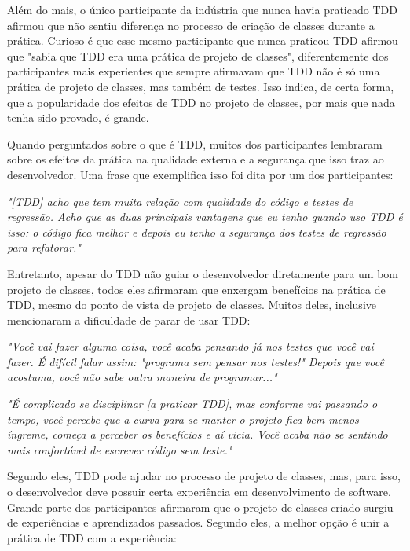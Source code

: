 Além do mais, o único participante da indústria que nunca havia
praticado TDD afirmou que não sentiu diferença no processo de criação de classes durante
a prática.
Curioso é que esse mesmo participante que nunca praticou TDD afirmou que "sabia que TDD era uma prática de projeto de classes",
diferentemente dos participantes mais experientes que sempre afirmavam que TDD não é só uma prática de projeto de classes,
mas também de testes. Isso indica, de certa forma, que a popularidade dos efeitos de TDD no projeto de classes, por mais
que nada tenha sido provado, é grande.

Quando perguntados sobre o que é TDD, muitos dos participantes lembraram sobre
os efeitos da prática na qualidade externa e a segurança que isso traz
ao desenvolvedor.
Uma frase que exemplifica isso foi dita por um dos participantes:

\begin{framed}
\textit{"[TDD] acho que tem muita relação com qualidade do código e testes 
de regressão. Acho que as duas principais vantagens que eu tenho quando uso TDD é isso: o código
fica melhor e depois eu tenho a segurança dos testes de regressão para refatorar."}
\end{framed}

Entretanto, apesar do TDD não guiar o desenvolvedor diretamente para um bom projeto de classes,
todos eles afirmaram que enxergam benefícios na prática de TDD, mesmo do
ponto de vista de projeto de classes. Muitos deles, inclusive mencionaram a dificuldade
de parar de usar TDD:

\begin{framed}
\textit{"Você vai fazer alguma coisa, você acaba pensando já nos testes que você vai fazer. É difícil 
falar assim: "programa sem pensar nos testes!" Depois que você acostuma, você não sabe outra
maneira de programar..."}
\end{framed}

\begin{framed}
\textit{"É complicado se disciplinar [a praticar TDD], mas conforme vai passando o tempo, 
você percebe que a curva para se manter o projeto fica bem menos íngreme, 
começa a perceber os benefícios e aí vicia. Você acaba não se sentindo
mais confortável de escrever código sem teste."}
\end{framed}

Segundo eles, TDD pode ajudar no processo de projeto de classes, mas, para isso,
o desenvolvedor deve possuir certa experiência em desenvolvimento de software. 
Grande parte dos participantes afirmaram que o 
projeto de classes criado surgiu de experiências e aprendizados passados.
Segundo eles, a melhor opção é unir a prática de TDD com a experiência:


